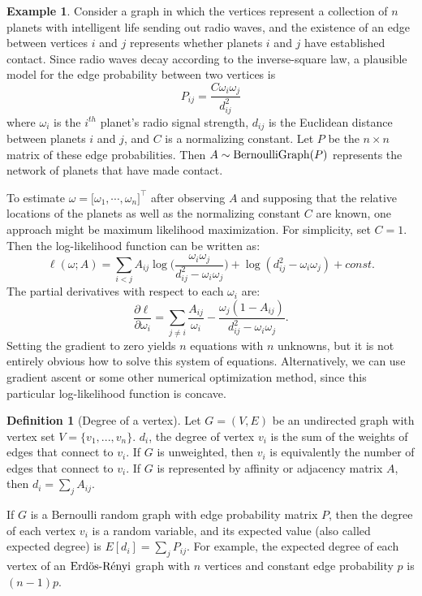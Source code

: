 \documentclass[
  12pt,
]{article}
\theoremstyle{definition}
\newtheorem{definition}{Definition}[section]
\theoremstyle{definition}
\newtheorem{example}{Example}[section]
\theoremstyle{definition}
\theoremstyle{definition}
\theoremstyle{remark}
\begin{document}
\begin{example}
Consider a graph in which the vertices represent a collection of $n$ planets with intelligent life sending out radio waves, and the existence of an edge between vertices $i$ and $j$ represents whether planets $i$ and $j$ have established contact.  
Since radio waves decay according to the inverse-square law, a plausible model for the edge probability between two vertices is 
$$P_{ij} = \frac{C \omega_i \omega_j}{d_{ij}^2}$$ 
where $\omega_i$ is the $i^{th}$ planet's radio signal strength, $d_{ij}$ is the Euclidean distance between planets $i$ and $j$, and $C$ is a normalizing constant. 
Let $P$ be the $n \times n$ matrix of these edge probabilities. 
Then $A \sim \mathrm{BernoulliGraph}(P)$ represents the network of planets that have made contact. 

To estimate $\omega = \big[ \omega_1, \cdots, \omega_n \big]^\top$ after observing $A$ and supposing that the relative locations of the planets as well as the normalizing constant $C$ are known, one approach might be maximum likelihood maximization. 
For simplicity, set $C = 1$. 
Then the log-likelihood function can be written as:
$$
\ell(\omega; A) = 
\sum_{i < j} A_{ij} \log \bigg( \frac{\omega_i \omega_j}{d_{ij}^2 -
\omega_i \omega_j} \bigg) + \log (d_{ij}^2 - \omega_i \omega_j) + const.
$$
The partial derivatives with respect to each $\omega_i$ are:
$$
\frac{\partial \ell}{\partial \omega_i} = \sum_{j \neq i} \frac{A_{ij}}{\omega_i} - \frac{\omega_j (1 - A_{ij})}{d_{ij}^2 - \omega_i \omega_j}.
$$
Setting the gradient to zero yields $n$ equations with $n$ unknowns, but it is not entirely obvious how to solve this system of equations. 
Alternatively, we can use gradient ascent or some other numerical optimization method, since this particular log-likelihood function is concave. 
\end{example}

\begin{definition}[Degree of a vertex]
\label{def:degree}
Let $G = (V, E)$ be an undirected graph with vertex set $V = \{v_1, ..., v_n\}$. 
$d_i$, the degree of vertex $v_i$ is the sum of the weights of edges that connect to $v_i$. 
If $G$ is unweighted, then $v_i$ is equivalently the number of edges that connect to $v_i$. 
If $G$ is represented by affinity or adjacency matrix $A$, then $d_i = \sum_j A_{ij}$. 

If $G$ is a Bernoulli random graph with edge probability matrix $P$, then the degree of each vertex $v_i$ is a random variable, and its expected value (also called expected degree) is $E[d_i] = \sum_j P_{ij}$. 
For example, the expected degree of each vertex of an $\text{Erd\"{o}s-R\'{e}nyi}$ graph with $n$ vertices and constant edge probability $p$ is $(n - 1) p$. 
\end{definition}
\end{document}
